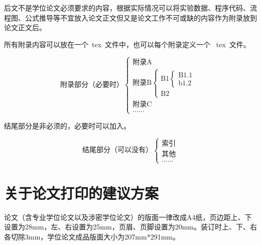 后文不是学位论文必须要求的内容，根据实际情况可以将实验数据、程序代码、流程图、公式推导等不宜放入论文正文但又是论文工作不可或缺的内容作为附录放到论文正文后。

所有附录内容可以放在一个~tex~文件中，也可以每个附录定义一个 ~tex~文件。

\[
  \text{附录部分（必要时）}
  \begin{cases}
    \text{附录A}               \\
    \text{附录B}
    \begin{cases}
      \text{B1}
      \begin{cases}
        \text{B1.1} \\
        \text{b1.2}
      \end{cases} \\
      \text{B2}
    \end{cases} \\
    \text{附录C}               \\
    \text{......}
  \end{cases}
\]

结尾部分是非必须的，必要时可以加入。

\[
  \text{结尾部分（可以没有）}
  \begin{cases}
    \text{索引} \\
    \text{其他} \\
    \text{......}
  \end{cases}
\]

\chapter{关于论文打印的建议方案}

论文（含专业学位论文以及涉密学位论文）的版面一律改成A4纸，页边距上、下设置为28mm，左、右设置为25mm，页眉、页脚设置为20mm。装订时上、下、右各切除3mm，学位论文成品版面大小为207mm*291mm。

